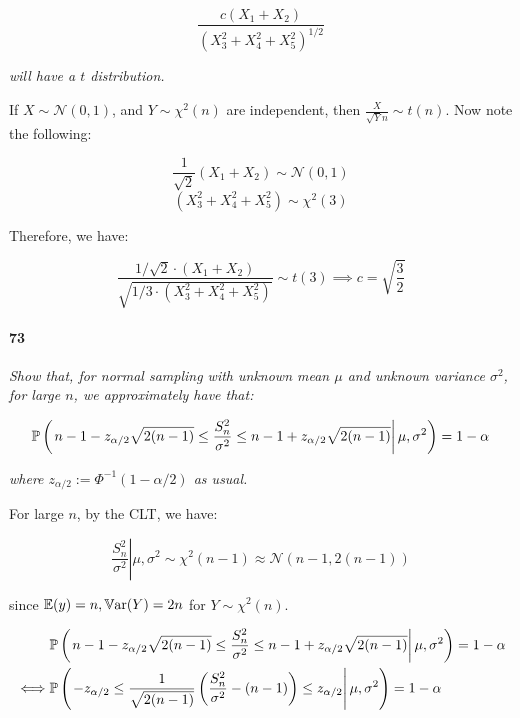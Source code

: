 \documentclass[a4paper]{article}
\begin{document}
            \[
                \frac{c(X_1 + X_2)}{(X_3^2 + X_4^2 + X_5^2)^{1/2}}
            \]

            \textit{will have a $t$ distribution.}

                If $X \sim \mathcal{N}(0, 1)$, and $Y \sim \chi^2(n)$ are
                independent, then $\frac{X}{\sqrt{Y}{n}} \sim t(n)$. Now note the
                following:

                \[
                    \frac{1}{\sqrt{2}} (X_1 + X_2) \sim \mathcal{N}(0, 1)
                \]
                \[
                    (X_3^2 + X_4^2 + X_5^2) \sim \chi^2(3)
                \]

                Therefore, we have:

                \[
                    \frac{1/\sqrt{2} \cdot (X_1 + X_2)}{\sqrt{1/3 \cdot (X_3^2 +
                    X_4^2 + X_5^2)}} \sim t(3) \implies c = \sqrt{\frac{3}{2}}
                \]

            \paragraph{73}
            \textit{Show that, for normal sampling with unknown mean $\mu$ and
            unknown variance $\sigma^2$, for large $n$, we approximately have
            that:}

            \[
                \mathbb{P}\left(\left.n - 1 - z_{\alpha/2}\sqrt{2(n - 1)} \leq
                \frac{S_n^2}{\sigma^2} \leq n - 1 + z_{\alpha/2}\sqrt{2(n - 1)}
                \right|\mu, \sigma^2\right) = 1 - \alpha
            \]

            \textit{where $z_{\alpha/2} := \Phi^{-1}(1 - \alpha/2)$ as usual.}

                For large $n$, by the CLT, we have:

                \[
                    \left.\frac{S_n^2}{\sigma^2}\right|\mu, \sigma^2 \sim
                    \chi^2(n -1) \approx \mathcal{N}(n - 1, 2(n - 1))
                \]

                since $\mathbb{E}(y) = n, \mathbb{V}\text{ar}(Y) = 2n$ for $Y \sim \chi^2(n)$.

                \begin{align*}
                    & \mathbb{P}\left(\left.n - 1 - z_{\alpha/2}\sqrt{2(n - 1)} \leq
                        \frac{S_n^2}{\sigma^2} \leq n - 1 + z_{\alpha/2}
                        \sqrt{2(n - 1)} \right|\mu, \sigma^2\right) = 1 - \alpha
                        \\
                    \iff & \mathbb{P}\left(\left.-z_{\alpha/2} \leq \frac{1}{\sqrt{2
                        (n-1)}}\left(\frac{S_n^2}{\sigma^2} - (n - 1)\right)
                        \leq z_{\alpha/2}\right|\mu, \sigma^2\right) = 1 -
                        \alpha
                \end{align*}
\end{document}
